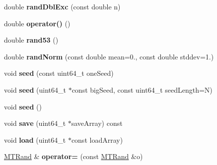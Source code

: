 \begin{DoxyCompactItemize}
\item 
\hypertarget{classMTRand_a1a81d8f00de8f553d4b8626d64e1c544}{double {\bfseries rand\-Dbl\-Exc} (const double n)}\label{classMTRand_a1a81d8f00de8f553d4b8626d64e1c544}

\item 
\hypertarget{classMTRand_abbb87a08d622d58fdee0eea4cb5471a0}{double {\bfseries operator()} ()}\label{classMTRand_abbb87a08d622d58fdee0eea4cb5471a0}

\item 
\hypertarget{classMTRand_a15f4daf79febbe4ff43c3e6ce2c4fcbe}{double {\bfseries rand53} ()}\label{classMTRand_a15f4daf79febbe4ff43c3e6ce2c4fcbe}

\item 
\hypertarget{classMTRand_a4c284f626b6d40a0367ff2a949ea1944}{double {\bfseries rand\-Norm} (const double mean=0., const double stddev=1.)}\label{classMTRand_a4c284f626b6d40a0367ff2a949ea1944}

\item 
\hypertarget{classMTRand_aa14afdf05231b303915d3ede9083933c}{void {\bfseries seed} (const uint64\-\_\-t one\-Seed)}\label{classMTRand_aa14afdf05231b303915d3ede9083933c}

\item 
\hypertarget{classMTRand_a685897ab29cb57074ddb663f2aaf3571}{void {\bfseries seed} (uint64\-\_\-t $\ast$const big\-Seed, const uint64\-\_\-t seed\-Length=N)}\label{classMTRand_a685897ab29cb57074ddb663f2aaf3571}

\item 
\hypertarget{classMTRand_ad88ea3363d55bafb62826bbd130279c2}{void {\bfseries seed} ()}\label{classMTRand_ad88ea3363d55bafb62826bbd130279c2}

\item 
\hypertarget{classMTRand_ac3dc3ece794feff49ba83ed2fa7a4da2}{void {\bfseries save} (uint64\-\_\-t $\ast$save\-Array) const }\label{classMTRand_ac3dc3ece794feff49ba83ed2fa7a4da2}

\item 
\hypertarget{classMTRand_add6ab0d26a0edeedd46853accae4eb1a}{void {\bfseries load} (uint64\-\_\-t $\ast$const load\-Array)}\label{classMTRand_add6ab0d26a0edeedd46853accae4eb1a}

\item 
\hypertarget{classMTRand_a3a6eb21add6f6ef4ce2d3280f2518521}{\hyperlink{classMTRand}{M\-T\-Rand} \& {\bfseries operator=} (const \hyperlink{classMTRand}{M\-T\-Rand} \&o)}\label{classMTRand_a3a6eb21add6f6ef4ce2d3280f2518521}

\end{DoxyCompactItemize}
